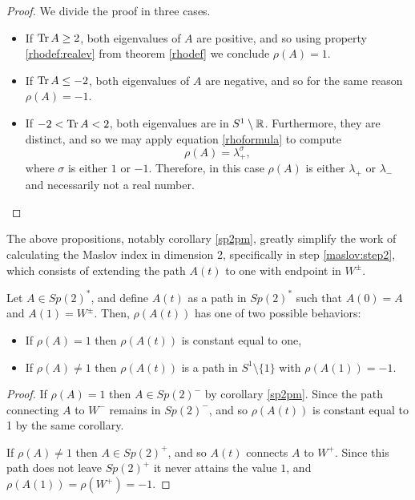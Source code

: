 \begin{proof}
We divide the proof in three cases.
\begin{itemize}
\item If $\operatorname{Tr} A \geq 2$, both eigenvalues of $A$ are positive, and so using property \ref{rhodef:realev} from theorem \ref{rhodef} we conclude $\rho(A) = 1$.
\item If $\operatorname{Tr} A \leq -2$, both eigenvalues of $A$ are negative, and so for the same reason $\rho(A) = -1$.
\item If $-2 < \operatorname{Tr} A < 2$, both eigenvalues are in $S^1 \setminus \mathbb{R}$. Furthermore, they are distinct, and so we may apply equation \eqref{rhoformula} to compute
\begin{equation}\label{sp2pm:3}
\rho(A) = \lambda_+^\sigma,
\end{equation}
where $\sigma$ is either $1$ or $-1$. Therefore, in this case $\rho(A)$ is either $\lambda_+$ or $\lambda_-$ and necessarily not a real number.
\end{itemize}
\end{proof}

The above propositions, notably corollary \ref{sp2pm}, greatly simplify the work of calculating the Maslov index in dimension 2, specifically in step \ref{maslov:step2}, which consists of extending the path $A(t)$ to one with endpoint in $W^\pm$.

\begin{corollary}\label{sp2rhoextension}
Let $A \in Sp(2)^*$, and define $A(t)$ as a path in $Sp(2)^*$ such that $A(0) = A$ and $A(1) = W^\pm$. Then, $\rho(A(t))$ has one of two possible behaviors:
\begin{itemize}
\item If $\rho(A) = 1$ then $\rho(A(t))$ is constant equal to one,
\item If $\rho(A) \neq 1$ then $\rho(A(t))$ is a path in $S^1 \setminus \{1\}$ with $\rho(A(1)) = -1$.
\end{itemize}
\end{corollary}

\begin{proof}
If $\rho(A) = 1$ then $A \in Sp(2)^-$ by corollary \ref{sp2pm}. Since the path connecting $A$ to $W^-$ remains in $Sp(2)^-$, and so $\rho(A(t))$ is constant equal to 1 by the same corollary.

If $\rho(A) \neq 1$ then $A \in Sp(2)^+$, and so $A(t)$ connects $A$ to $W^+$. Since this path does not leave $Sp(2)^+$ it never attains the value $1$, and $\rho(A(1)) = \rho(W^+) = -1$.
\end{proof}

